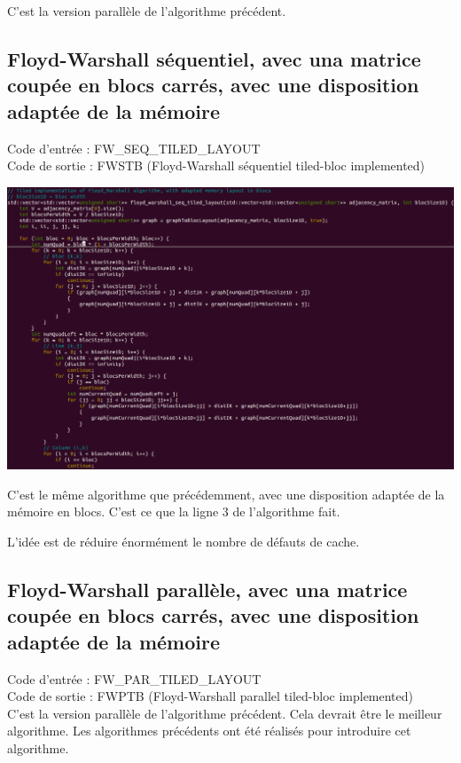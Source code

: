 \documentclass[a4paper,11pt]{article}
\begin{document}
C'est la version parallèle de l'algorithme précédent.

\subsection{Floyd-Warshall séquentiel, avec una matrice coupée en blocs carrés, avec une disposition adaptée de la mémoire}

\noindent Code d'entrée : FW\_SEQ\_TILED\_LAYOUT \\
Code de sortie : FWSTB (Floyd-Warshall séquentiel tiled-bloc implemented)

\begin{center}
  \includegraphics[scale=0.5]{FW_SEQ_TILED_LAYOUT.png}
\end{center}

C'est le même algorithme que précédemment, avec une disposition adaptée de la mémoire en blocs. C'est ce que la ligne 3 de l'algorithme fait.

L'idée est de réduire énormément le nombre de défauts de cache.

\subsection{Floyd-Warshall parallèle, avec una matrice coupée en blocs carrés, avec une disposition adaptée de la mémoire}

\noindent Code d'entrée : FW\_PAR\_TILED\_LAYOUT \\
Code de sortie : FWPTB (Floyd-Warshall parallel tiled-bloc implemented)\\

C'est la version parallèle de l'algorithme précédent. Cela devrait être le meilleur algorithme. Les algorithmes précédents ont été réalisés pour introduire cet algorithme.
\end{document}
